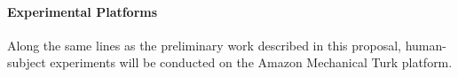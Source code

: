 
\paragraph{Experimental Platforms}

Along the same lines as the preliminary work described in this
proposal, human-subject experiments will be conducted on the Amazon
Mechanical Turk platform.

